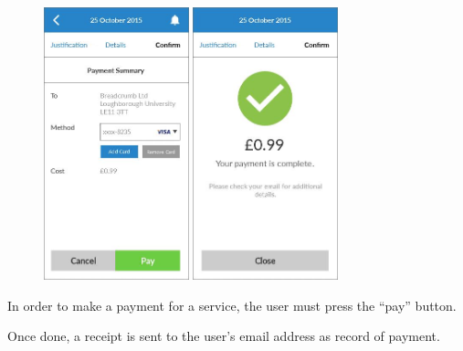 \begin{figure}
  \subfigures
  \centering
  \begin{minipage}{4.6cm}
    \centering
    \includegraphics[width=4.2cm]{inc/ui_payment_mk_step1.jpg}
    \caption{}
    \label{fig:ui_payment_mk_step1}
  \end{minipage}
  \begin{minipage}{4.6cm}
    \centering
    \includegraphics[width=4.2cm]{inc/ui_payment_mk_step2.jpg}
    \caption{}
    \label{fig:ui_payment_mk_step2}
  \end{minipage}
\end{figure}

\begin{minipage}{\textwidth}
  \centering
  \begin{minipage}[t]{4.6cm}
    \vspace{0pt}
    \centering
    \begin{minipage}{4.4cm}
      In order to make a payment for a service, the user must press the ``pay'' button.
    \end{minipage}
  \end{minipage}
  \begin{minipage}[t]{4.6cm}
    \vspace{0pt}
    \centering
    \begin{minipage}{4.4cm}
      Once done, a receipt is sent to the user’s email address as record of payment.
    \end{minipage}
  \end{minipage}
\end{minipage}

